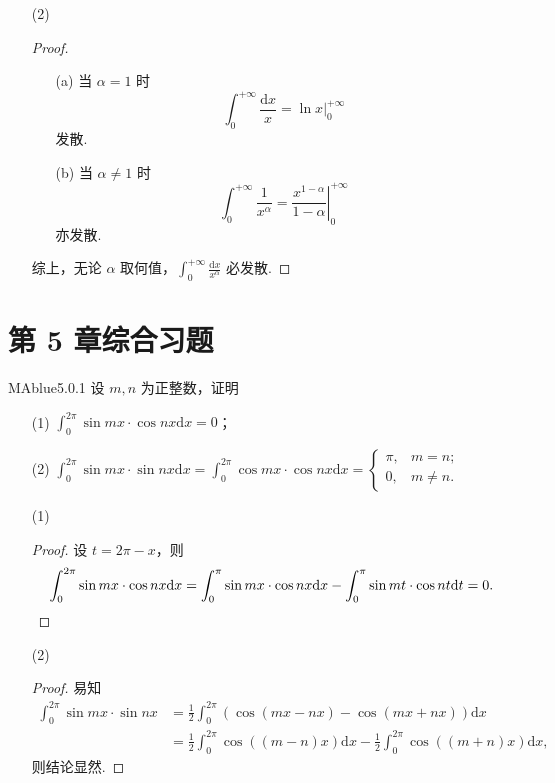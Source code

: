 \begin{enumerate}
    \item[(2)]
    \begin{proof}
        \leavevmode
        \begin{enumerate}
            \item[(a)]
            当 $\alpha = 1$ 时
            \[
                \int_0^{+\infty} \frac {\mathrm dx} x = \ln x \bigg|_0^{+\infty}
            \]
            发散.
            \item[(b)]
            当 $\alpha \neq 1$ 时
            \[
                \int_0^{+\infty} \frac 1 {x^\alpha} = \left. \frac{x^{1-\alpha}}{1-\alpha} \right|_0^{+\infty}
            \]
            亦发散.
        \end{enumerate}
        综上，无论 $\alpha$ 取何值，$\int_0^{+\infty} \frac{\mathrm dx}{x^{\alpha}} $ 必发散.
    \end{proof}
\end{enumerate}

\section*{第 5 章综合习题}

\begin{problem}{MAblue}{5.0.1}
    设 $m, n$ 为正整数，证明
    \begin{enumerate}
        \item[(1)]
        $\displaystyle \int_0^{2\pi} \sin mx \cdot \cos nx \mathrm dx = 0$；
        \item[(2)]
        $\displaystyle \int_0^{2\pi} \sin mx \cdot \sin nx \mathrm dx = \int_0^{2\pi} \cos mx \cdot \cos nx \mathrm dx = \begin{cases}
            \pi, & m = n; \\
            0, & m \neq n.
        \end{cases}$
    \end{enumerate}
\end{problem}

\begin{enumerate}
    \item[(1)]
    \begin{proof}
        设 $t = 2 \pi - x$，则
        \[
            \int_0^{2 \pi} \sin mx \cdot \cos nx \mathrm dx = \int_0^\pi \sin mx \cdot \cos nx \mathrm dx - \int_0^\pi \sin mt \cdot \cos nt \mathrm dt = 0. \qedhere
        \]
    \end{proof}
    \item[(2)]
    \begin{proof}
        易知
        \begin{align*}
            \int_0^{2\pi} \sin mx \cdot \sin nx &= \frac 1 2 \int_0^{2\pi} \left( \cos( mx - nx ) - \cos( mx + nx ) \right) \mathrm dx \\
            &= \frac 1 2 \int_0^{2\pi} \cos \left( (m - n)x \right) \mathrm dx - \frac 1 2 \int_0^{2\pi} \cos \left( (m + n)x \right) \mathrm dx,
        \end{align*}
        则结论显然.
    \end{proof}
\end{enumerate}

